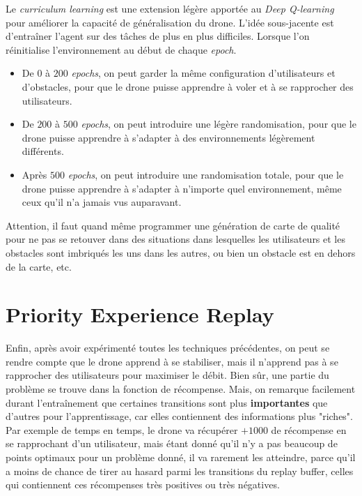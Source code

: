 \documentclass{article}
\begin{document}
Le \textit{curriculum learning} est une extension légère apportée au \textit{Deep Q-learning} pour améliorer la capacité de généralisation du drone.
L'idée sous-jacente est d'entraîner l'agent sur des tâches de plus en plus difficiles.
Lorsque l'on réinitialise l'environnement au début de chaque \textit{epoch}.
\begin{itemize}
    \item De $0$ à $200$ \textit{epochs}, on peut garder la même configuration d'utilisateurs et d'obstacles, pour que le drone puisse apprendre à voler et à se rapprocher des utilisateurs.
    \item De $200$ à $500$ \textit{epochs}, on peut introduire une légère randomisation, pour que le drone puisse apprendre à s'adapter à des environnements légèrement différents.
    \item Après $500$ \textit{epochs}, on peut introduire une randomisation totale, pour que le drone puisse apprendre à s'adapter à n'importe quel environnement, même ceux qu'il n'a jamais vus auparavant.
\end{itemize}

Attention, il faut quand même programmer une génération de carte de qualité pour ne pas se retouver dans
des situations dans lesquelles les utilisateurs et les obstacles sont imbriqués les uns dans les autres, 
ou bien un obstacle est en dehors de la carte, etc.

\section{Priority Experience Replay}

Enfin, après avoir expérimenté toutes les techniques précédentes, 
on peut se rendre compte que le drone apprend à se stabiliser,
mais il n'apprend pas à se rapprocher des utilisateurs pour maximiser le débit.
Bien sûr, une partie du problème se trouve dans la fonction de récompense.
Mais, on remarque facilement durant l'entraînement que certaines transitions 
sont plus \textbf{importantes} que d'autres pour l'apprentissage, 
car elles contiennent des informations plus "riches".
Par exemple de temps en temps, le drone va récupérer $+1000$ de récompense en se rapprochant d'un utilisateur, 
mais étant donné qu'il n'y a pas beaucoup de points optimaux pour un problème donné, 
il va rarement les atteindre, parce qu'il a moins de chance de tirer au hasard
parmi les transitions du replay buffer, celles qui contiennent ces récompenses très positives ou très négatives.
\end{document}
